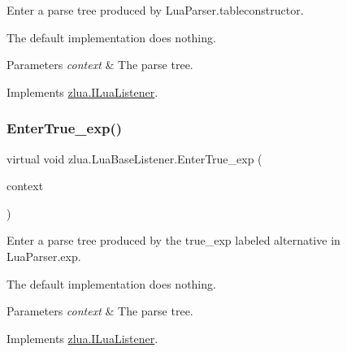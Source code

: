 Enter a parse tree produced by Lua\+Parser.\+tableconstructor. 

The default implementation does nothing.


\begin{DoxyParams}{Parameters}
{\em context} & The parse tree.\\
\hline
\end{DoxyParams}


Implements \mbox{\hyperlink{interfacezlua_1_1_i_lua_listener_a76ec51ed7a280ef9f86058371d6fbebc}{zlua.\+I\+Lua\+Listener}}.

\mbox{\label{classzlua_1_1_lua_base_listener_a1c2fbf0cc7a011728a19e25d1cc6f967}} 
\subsubsection{\texorpdfstring{Enter\+True\+\_\+exp()}{EnterTrue\_exp()}}
{\footnotesize\ttfamily virtual void zlua.\+Lua\+Base\+Listener.\+Enter\+True\+\_\+exp (\begin{DoxyParamCaption}\item[{\mbox{[}\+Not\+Null\mbox{]} \mbox{\hyperlink{classzlua_1_1_lua_parser_1_1_true__exp_context}{Lua\+Parser.\+True\+\_\+exp\+Context}}}]{context }\end{DoxyParamCaption})\hspace{0.3cm}{\ttfamily [virtual]}}



Enter a parse tree produced by the {\ttfamily true\+\_\+exp} labeled alternative in Lua\+Parser.\+exp. 

The default implementation does nothing.


\begin{DoxyParams}{Parameters}
{\em context} & The parse tree.\\
\hline
\end{DoxyParams}


Implements \mbox{\hyperlink{interfacezlua_1_1_i_lua_listener_af32ce4f4ae58233d0a29cf03e5183347}{zlua.\+I\+Lua\+Listener}}.

\mbox{\label{classzlua_1_1_lua_base_listener_a45218c758db2cd6275fe4e000ae9a77e}} 
